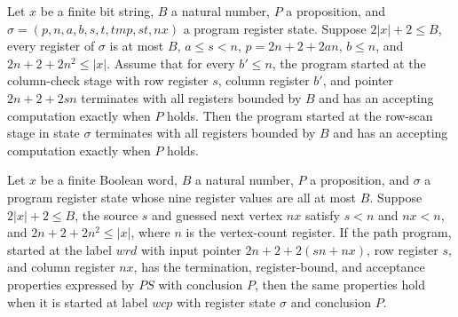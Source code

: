 \begin{lemma}
\label{Complexity.LogProg.ps_row}
\leanok
{}
Let $x$ be a finite bit string, $B$ a natural number, $P$ a proposition, and
$\sigma=(p,n,a,b,s,t,tmp,st,nx)$ a program register state. Suppose $2|x|+2\le B$, every
register of $\sigma$ is at most $B$, $a\le s<n$, $p=2n+2+2an$, $b\le n$, and $2n+2+2n^2\le
|x|$. Assume that for every $b'\le n$, the program started at the column-check stage
with row register $s$, column register $b'$, and pointer $2n+2+2sn$ terminates with all
registers bounded by $B$ and has an accepting computation exactly when $P$ holds. Then
the program started at the row-scan stage in state $\sigma$ terminates with all registers
bounded by $B$ and has an accepting computation exactly when $P$ holds.
\end{lemma}

\begin{lemma}
\label{Complexity.LogProg.ps_index}
\leanok
{}
Let $x$ be a finite Boolean word, $B$ a natural number, $P$ a proposition, and $\sigma$
a program register state whose nine register values are all at most $B$. Suppose
$2|x|+2\le B$, the source $s$ and guessed next vertex $nx$ satisfy $s<n$ and $nx<n$, and
$2n+2+2n^2\le |x|$, where $n$ is the vertex-count register. If the path program, started
at the label $wrd$ with input pointer $2n+2+2(sn+nx)$, row register $s$, and column
register $nx$, has the termination, register-bound, and acceptance properties expressed
by $PS$ with conclusion $P$, then the same properties hold when it is started at label
$wcp$ with register state $\sigma$ and conclusion $P$.
\end{lemma}

